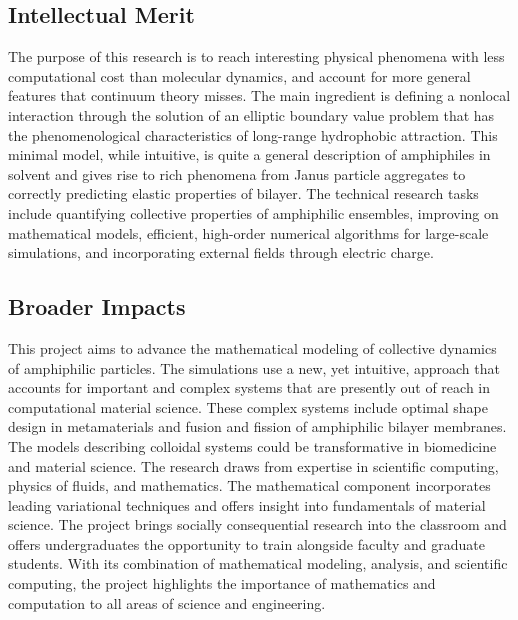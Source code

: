 \documentclass{article}
\begin{document}
\subsection*{Intellectual Merit}
The purpose of this research is to reach interesting physical phenomena with less computational cost than molecular dynamics, and account for more general features that continuum theory misses. The main ingredient is defining a nonlocal interaction through the solution of an elliptic boundary value problem that has the phenomenological characteristics of long-range hydrophobic attraction. This minimal model, while intuitive, is quite a general description of amphiphiles in solvent and gives rise to rich phenomena from Janus particle aggregates to correctly predicting elastic properties of bilayer. The technical research tasks include quantifying collective properties of amphiphilic ensembles, improving on mathematical models, efficient, high-order numerical algorithms for large-scale simulations, and incorporating external fields through electric charge.


\subsection*{Broader Impacts}
This project aims to advance the mathematical modeling of collective dynamics of amphiphilic particles. The simulations use a new, yet intuitive, approach that accounts for important and complex systems that are presently out of reach in computational material science. These complex systems include optimal shape design in metamaterials and fusion and fission of amphiphilic bilayer membranes. The models describing colloidal systems could be transformative in biomedicine and material science. The research draws from expertise in scientific computing, physics of fluids, and mathematics. The mathematical component incorporates leading variational techniques and offers insight into fundamentals of material science. The project brings socially consequential research into the classroom and offers 
undergraduates the opportunity to train alongside faculty and graduate students. With its combination of mathematical modeling, analysis, and scientific computing, the project highlights the importance of mathematics and computation to all areas of science and engineering.
\end{document}
